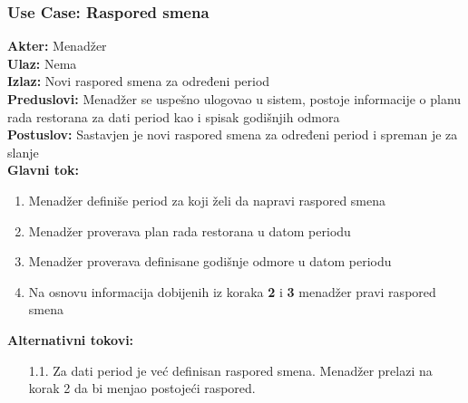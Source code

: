 \documentclass{article}
\begin{document}
\subsubsection{\textbf{Use Case}: Raspored smena}
\textbf{Akter:} Menadžer\\
\textbf{Ulaz:} Nema\\
\textbf{Izlaz:} Novi raspored smena za određeni period\\
\textbf{Preduslovi:} Menadžer se uspešno ulogovao u sistem, postoje informacije o planu rada restorana za dati period kao i spisak godišnjih odmora\\
\textbf{Postuslov:} Sastavjen je novi raspored smena za određeni period i spreman je za slanje\\
\textbf{Glavni tok:} 
\begin{enumerate}
\item Menadžer definiše period za koji želi da napravi raspored smena
\item Menadžer proverava plan rada restorana u datom periodu
\item Menadžer proverava definisane godišnje odmore u datom periodu
\item Na osnovu informacija dobijenih iz koraka \textbf{2} i \textbf{3} menadžer pravi raspored smena
\end{enumerate}

\textbf{Alternativni tokovi:} \\
\begin{itemize}
\item [1.1.] Za dati period je već definisan raspored smena. Menadžer prelazi na korak 2 da bi menjao postojeći raspored.
\end{itemize}
\end{document}
